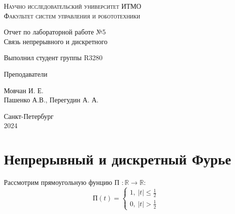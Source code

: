 \documentclass[a4paper,hidelinks,14pt]{extarticle}
\begin{document}
	\begin{titlepage}
		\setlength{\parindent}{0ex}
		
		\begin{center}
			\textsc{
				\vspace{1ex}
				Научно исследовательский университет ИТМО \\
				\vspace{0.5ex}
				Факультет систем управления и робототехники \\
				\vspace{0.5ex}
			}
		\end{center}
		
		\vspace{50mm}
		
		\begin{center}
			Отчет по лабораторной работе №5 \\
			Связь непрерывного и дискретного
		\end{center}
		
		\vspace{50mm}
		
		\begin{minipage}{.55\linewidth}
			Выполнил студент группы R3280
			
			Преподаватели
		\end{minipage}
		\hfill
		\begin{minipage}{.5\linewidth}
			\begin{flushright}
				Мовчан И. Е.
				\\
				Пашенко А.В., Перегудин А. А.
			\end{flushright}
		\end{minipage}
		
		\vfill
		\begin{center}
			Санкт-Петербург
			\\
			2024
		\end{center}
		
	\end{titlepage}
	
	\section{Непрерывный и дискретный Фурье}
	Рассмотрим прямоугольную фунцию П $: \mathbb{R} \rightarrow \mathbb{R}$:
	$$
		\text{П}(t) =
		\begin{cases*}
			1, \ |t| \leq \frac{1}{2} \\
			0, \ |t| > \frac{1}{2}
		\end{cases*}	
	$$
		
\end{document}
